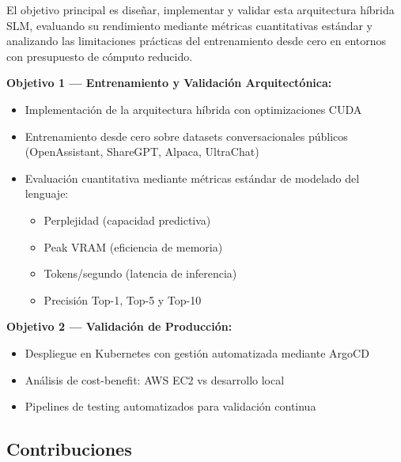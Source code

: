 El objetivo principal es diseñar, implementar y validar esta arquitectura híbrida SLM, evaluando su rendimiento mediante métricas cuantitativas estándar y analizando las limitaciones prácticas del entrenamiento desde cero en entornos con presupuesto de cómputo reducido.

\textbf{Objetivo 1 --- Entrenamiento y Validación Arquitectónica:}
\begin{itemize}
    \item Implementación de la arquitectura híbrida con optimizaciones CUDA
    \item Entrenamiento desde cero sobre datasets conversacionales públicos (OpenAssistant, ShareGPT, Alpaca, UltraChat)
    \item Evaluación cuantitativa mediante métricas estándar de modelado del lenguaje:
    \begin{itemize}
        \item Perplejidad (capacidad predictiva)
        \item Peak VRAM (eficiencia de memoria)
        \item Tokens/segundo (latencia de inferencia)
        \item Precisión Top-1, Top-5 y Top-10
    \end{itemize}
\end{itemize}

\textbf{Objetivo 2 --- Validación de Producción:}
\begin{itemize}
    \item Despliegue en Kubernetes con gestión automatizada mediante ArgoCD
    \item Análisis de cost-benefit: AWS EC2 vs desarrollo local
    \item Pipelines de testing automatizados para validación continua
\end{itemize}

\subsection{Contribuciones}

